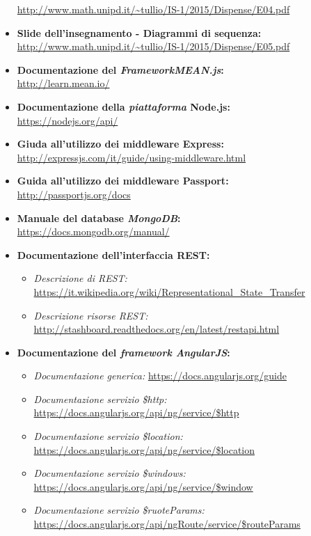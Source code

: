 \begin{itemize}
		\url{http://www.math.unipd.it/~tullio/IS-1/2015/Dispense/E04.pdf}
	\item \textbf{Slide dell'insegnamento - Diagrammi di sequenza:} \\
		\url{http://www.math.unipd.it/~tullio/IS-1/2015/Dispense/E05.pdf}
	\item \textbf{Documentazione del \textit{FrameworkMEAN.js}:} \\
		\url{http://learn.mean.io/}
	\item \textbf{Documentazione della \textit{piattaforma} Node.js:} \\
		\url{https://nodejs.org/api/}
	\item \textbf{Giuda all'utilizzo dei middleware Express:} \\
		\url{http://expressjs.com/it/guide/using-middleware.html}
	\item \textbf{Guida all'utilizzo dei middleware Passport:} \\
		\url{http://passportjs.org/docs}
	\item \textbf{Manuale del database \textit{MongoDB}:} \\
		\url{https://docs.mongodb.org/manual/}
	\item \textbf{Documentazione dell'interfaccia REST:}
		\begin{itemize}
			\item \textit{Descrizione di REST:} \url{https://it.wikipedia.org/wiki/Representational_State_Transfer}
			\item \textit{Descrizione risorse REST:} \url{http://stashboard.readthedocs.org/en/latest/restapi.html}
		\end{itemize}
	\item \textbf{Documentazione del \textit{framework AngularJS}:} \\
		\begin{itemize}
			\item \textit{Documentazione generica:} \url{https://docs.angularjs.org/guide}
			\item \textit{Documentazione servizio \$http:} \url{https://docs.angularjs.org/api/ng/service/\$http}
			\item \textit{Documentazione servizio \$location:} \url{https://docs.angularjs.org/api/ng/service/\$location}
			\item \textit{Documentazione servizio \$windows:} \url{https://docs.angularjs.org/api/ng/service/\$window}
			\item \textit{Documentazione servizio \$ruoteParams:} \url{https://docs.angularjs.org/api/ngRoute/service/\$routeParams}

\end{itemize}
\end{itemize}
